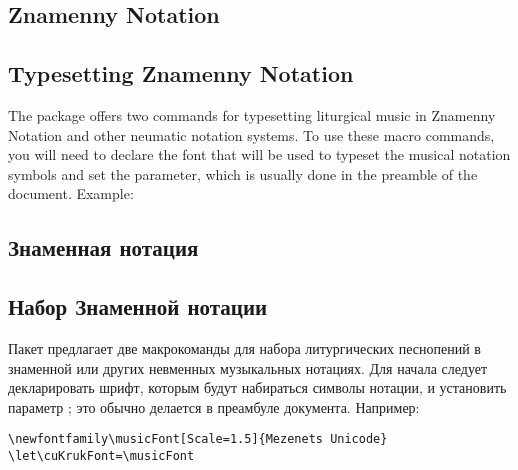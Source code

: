 \begin{EN}
\section{Znamenny Notation}
\subsection{Typesetting Znamenny Notation}
The package offers two commands for typesetting liturgical music in Znamenny Notation and other neumatic notation systems. To use these macro commands, you will need to declare the font that will be used to typeset the musical notation symbols and set the  parameter, which is usually done in the preamble of the document. Example:
\end{EN}
%
\begin{RU}
\section{Знаменная нотация}
\subsection{Набор Знаменной нотации}
Пакет предлагает две макрокоманды для набора литургических песнопений в знаменной или других невменных музыкальных нотациях. Для начала следует декларировать шрифт, которым будут набираться символы нотации, и установить параметр ; это обычно делается в преамбуле документа. Например:
\end{RU}

\label{znamenny}
\begin{verbatim}
\newfontfamily\musicFont[Scale=1.5]{Mezenets Unicode}
\let\cuKrukFont=\musicFont
\end{verbatim}

